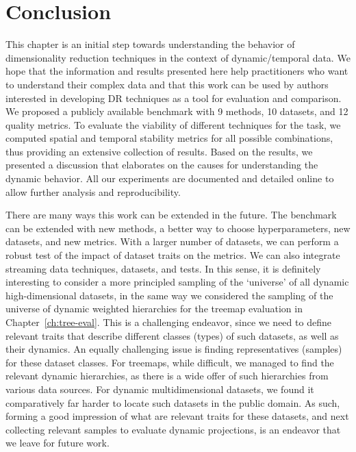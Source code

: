 \section{Conclusion}
\label{sec:conclusion}
%
This chapter is an initial step towards understanding the behavior of dimensionality reduction techniques in the context of dynamic/temporal data. We hope that the information and results presented here help practitioners who want to understand their complex data and that this work can be used by authors interested in developing DR techniques as a tool for evaluation and comparison.
We proposed a publicly available benchmark with 9 methods, 10 datasets, and 12 quality metrics. To evaluate the viability of different techniques for the task, we computed spatial and temporal stability metrics for all possible combinations, thus providing an extensive collection of results. Based on the results, we presented a discussion that elaborates on the causes for understanding the dynamic behavior. All our experiments are documented and detailed online \citep{repo} to allow further analysis and reproducibility.

There are many ways this work can be extended in the future.
The benchmark can be extended with new methods, a better way to choose hyperparameters, new datasets, and new metrics. With a larger number of datasets, we can perform a robust test of the impact of dataset traits on the metrics.
We can also integrate streaming data techniques, datasets, and tests. In this sense, it is definitely interesting to consider a more principled sampling of the `universe' of all dynamic high-dimensional datasets, in the same way we considered the sampling of the universe of dynamic weighted hierarchies for the treemap evaluation in Chapter~\ref{ch:tree-eval}. This is a challenging endeavor, since we need to define relevant traits that describe different classes (types) of such datasets, as well as their dynamics. An equally challenging issue is finding representatives (samples) for these dataset classes. For treemaps, while difficult, we managed to find the relevant dynamic hierarchies, as there is a wide offer of such hierarchies from various data sources. For dynamic multidimensional datasets, we found it comparatively far harder to locate such datasets in the public domain. As such, forming a good impression of what are relevant traits for these datasets, and next collecting relevant samples to evaluate dynamic projections, is an endeavor that we leave for future work.


\newpage
    
